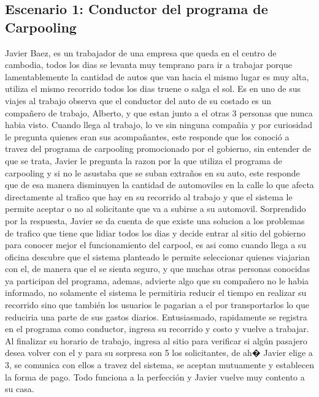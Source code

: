 \documentclass[a4paper,titlepage,10pt]{article}
\begin{document}
\subsection{Escenario 1: Conductor del programa de Carpooling}
Javier Baez, es un trabajador de una empresa que queda en el centro de cambodia, todos los dias se levanta muy temprano para ir a trabajar
porque lamentablemente la cantidad de autos que van hacia el mismo lugar es muy alta, utiliza el mismo recorrido todos los dias truene o salga el sol.
Es en uno de sus viajes al trabajo observa que el conductor del auto de su costado es un compa\~nero de trabajo, Alberto, y que estan junto a el otras 3 personas que nunca habia visto.
Cuando llega al trabajo, lo ve sin ninguna compa\~nia y por curiosidad le pregunta quienes eran sus acompa\~nantes, este responde que los conoci\'o a travez del programa de carpooling promocionado por el 
gobierno, sin entender de que se trata, Javier le pregunta la razon por la que utiliza el programa de carpooling y si no le asustaba que se suban extra\~nos en su auto, este responde que de esa manera 
disminuyen la cantidad de automoviles en la calle lo que afecta directamente al trafico que hay en su recorrido al trabajo y que el sistema le permite aceptar o no al solicitante que va a subirse a su 
automovil. Sorprendido por la respuesta, Javier se da cuenta de que existe una solucion a los problemas de trafico que tiene que lidiar todos los dias y decide entrar al sitio del gobierno para conocer 
mejor el funcionamiento del carpool, es asi como cuando llega a su oficina descubre que el sistema planteado le permite seleccionar quienes viajarian con el, de manera que el se sienta seguro, y que muchas 
otras personas conocidas ya participan del programa, ademas, advierte algo que su compa\~nero no le habia informado, no solamente el sistema le permitiria reducir el tiempo en realizar su recorrido sino que 
tambi\'en los usuarios le pagarian a el por transportarlos lo que reduciria una parte de sus gastos diarios. Entusiasmado, rapidamente se registra en el programa como conductor, ingresa su recorrido y costo 
y vuelve a trabajar. Al finalizar su horario de trabajo, ingresa al sitio para verificar si alg\'un pasajero desea volver con el y para su sorpresa son 5 los solicitantes, de ah� Javier elige a 3, se 
comunica con ellos a travez del sistema, se aceptan mutuamente y establecen la forma de pago. Todo funciona a la perfecci\'on y Javier vuelve muy contento a su casa.
\end{document}
